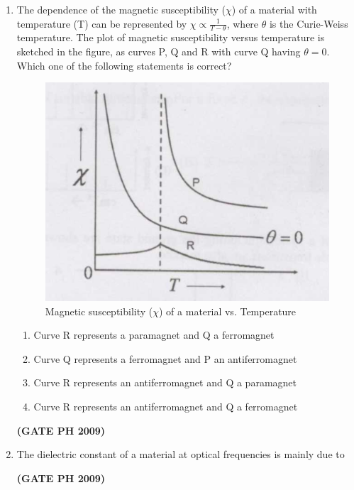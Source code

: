 \documentclass[14pt, a4paper]{extarticle}
\begin{document}
\begin{enumerate}[label=\textbf{Q. \arabic*}, start=21]
\item The dependence of the magnetic susceptibility ($\chi$) of a material with temperature (T) can be represented by $\chi \propto \frac{1}{T-\theta}$, where $\theta$ is the Curie-Weiss temperature.
The plot of magnetic susceptibility versus temperature is sketched in the figure, as curves P, Q and R with curve Q having $\theta=0$.
Which one of the following statements is correct?
\begin{figure}[H]
\centering
\includegraphics[width=0.5\columnwidth]{figs/Q27figs.png}
\caption{Magnetic susceptibility ($\chi$) of a material vs. Temperature}
\label{fig:q27}
\end{figure}
\begin{enumerate}
\item Curve R represents a paramagnet and Q a ferromagnet
\item Curve Q represents a ferromagnet and P an antiferromagnet
\item Curve R represents an antiferromagnet and Q a paramagnet
\item Curve R represents an antiferromagnet and Q a ferromagnet
\end{enumerate}
\hfill \textbf{(GATE PH 2009)}

\item The dielectric constant of a material at optical frequencies is mainly due to
\begin{enumerate}
\end{enumerate}
\hfill \textbf{(GATE PH 2009)}


\end{enumerate}
\end{document}
